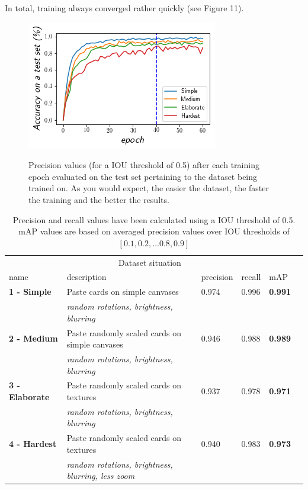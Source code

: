 \documentclass[a4paper]{article}
\begin{document}
In total, training always converged rather quickly (see Figure 11).\\
\begin{figure}

\includegraphics[scale=1]{images/loss}
\label{fig:curve}
\caption{Precision values (for a IOU threshold of 0.5) after each training epoch evaluated on the test set pertaining to the dataset being trained on. As you would expect, the easier the dataset, the faster the training and the better the results. }


\end{figure}
\begin{table}[h]


\begin{tabular}{lllllr}
\hline
\multicolumn{5}{c}{Dataset situation} \\
\cline{1-2}
name    & description  & precision & recall & mAP \\
\hline
\textbf{1 - Simple}      & Paste cards on simple canvases    &  0.974  & 0.996 & \textbf{0.991} \\
          & \textit{random rotations, brightness, blurring}     & & & \\
\textbf{2 - Medium}      & Paste randomly scaled cards on simple canvases & 0.946 & 0.988 & \textbf{0.989} \\
          & \textit{random rotations, brightness, blurring}     & & & \\
\textbf{3 - Elaborate}       & Paste randomly scaled cards on textures & 0.937 & 0.978 & \textbf{0.971} \\
          & \textit{random rotations, brightness, blurring}     & & & \\
\textbf{4 - Hardest} & Paste randomly scaled cards on textures & 0.940 & 0.983 & \textbf{0.973} \\
          & \textit{random rotations, brightness, blurring, less zoom}     & & & \\
\hline


\end{tabular}
\caption{Precision and recall values have been calculated using a IOU threshold of 0.5. mAP values are based on averaged precision values over IOU thresholds of $[0.1, 0.2, \dots 0.8, 0.9] $  }
\label{tab:res}
\end{table}
\end{document}
